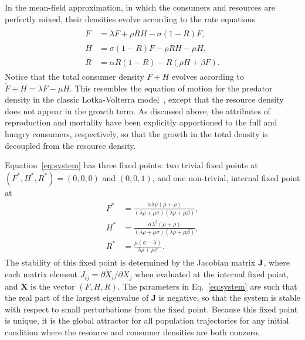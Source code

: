 \documentclass[11pt]{article}
\begin{document}
\begin{multicols}{2}
In the mean-field approximation, in which the consumers and resources are perfectly mixed, their densities evolve according to the rate equations
\begin{align} 
\label{eq:system}
\begin{split}
\dot{F} &= \lambda F + \rho RH - \sigma (1-R)F,  \\
\dot{H} &= \sigma (1-R)F - \rho RH - \mu H,  \\
\dot{R} &= \alpha R(1-R) - R(\rho H+ \beta F).
\end{split}
\end{align}
Notice that the total consumer density $F+H$ evolves according to $\dot{F}+\dot{H}=\lambda F-\mu H$.  
This resembles the equation of motion for the predator density in the classic Lotka-Volterra model~\cite{murray2011mathematical}, except that the resource density does not appear in the growth term.  
As discussed above, the attributes of reproduction and mortality have been explicitly apportioned to the full and hungry consumers, respectively, so that the growth in the total density is decoupled from the resource density.

Equation~\eqref{eq:system} has three fixed points: two trivial fixed points at $(F^*,H^*,R^*)=(0,0,0)$ and $(0,0,1)$, and one non-trivial, internal fixed point at
\begin{align}
\label{eq:ss}
\begin{split}
F^* &= \frac{\alpha  \lambda  \mu  (\mu +\rho )}{(\lambda  \rho +\mu  \sigma ) (\lambda  \rho +\mu  \beta)}, \\
H^* &= \frac{\alpha  \lambda ^2 (\mu +\rho )}{(\lambda  \rho +\mu  \sigma ) (\lambda  \rho +\mu  \beta)}, \\
R^* &= \frac{\mu  (\sigma -\lambda )}{\lambda  \rho +\mu  \sigma }.
\end{split}
\end{align}
The stability of this fixed point is determined by the Jacobian matrix $\bf J$, where each matrix element $J_{ij}=\partial{\dot X_i}/\partial{X_j}$ when evaluated at the internal fixed point, and $\mathbf{X}$ is the vector $(F,H,R)$.  
The parameters in Eq.~\eqref{eq:system} are such that the real part of the largest eigenvalue of $\mathbf{J}$ is negative, so that the system is stable with respect to small perturbations from the fixed point. 
Because this fixed point is unique, it is the global attractor for all population trajectories for any initial condition where the resource and consumer densities are both nonzero.


\end{multicols}
\end{document}
